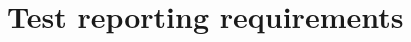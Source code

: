 \section{Test reporting requirements} \label{s:details-of-the-master-test-plan:test-reporting-requirements}
	\begin{comment}
		$<$ Specify the purpose, content, format, recipients, and timing of all test reports. Test reporting consists of Test Logs (Clause 13), Anomaly Reports (Clause 14), Level Interim Test Status Report(s) (Clause 15), Level Test Report(s) (Clause 16), and the Master Test Report (Clause 17). Test reporting may also include optional reports defined by the user of this standard. The format and grouping of the optional reports are user defined and will vary according to subject matter. $>$
	\end{comment}
